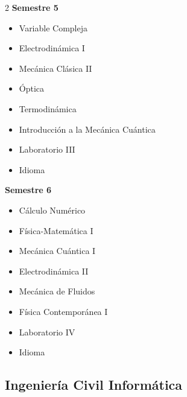 \documentclass[12pt,a4paper]{article}
\begin{document}
\begin{multicols}{2}
		\textbf{Semestre 5}
		\begin{itemize}
			\item Variable Compleja
			\item Electrodinámica I
			\item Mecánica Clásica II
			\item Óptica
			\item Termodinámica
			\item Introducción a la Mecánica Cuántica
			\item Laboratorio III
			\item Idioma
		\end{itemize}
		
		\textbf{Semestre 6}
		\begin{itemize}
			\item Cálculo Numérico
			\item Física-Matemática I
			\item Mecánica Cuántica I
			\item Electrodinámica II
			\item Mecánica de Fluidos
			\item Física Contemporánea I
			\item Laboratorio IV
			\item Idioma
		\end{itemize}
	\end{multicols}
	
	\newpage
	
	\subsection{Ingeniería Civil Informática}
	
\end{document}
